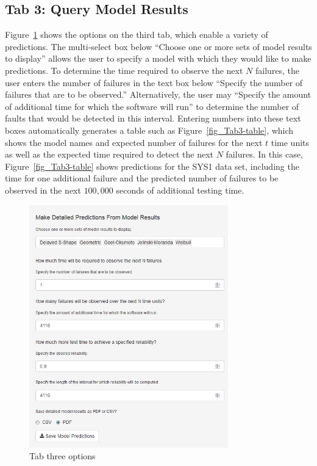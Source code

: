 \documentclass[journal]{IEEEtran}
\begin{document}
\subsection{Tab 3: Query Model Results}\label{tab3}
Figure~\ref{fig_Tab3} shows the options on the third tab, which enable a variety of predictions. The multi-select box below ``Choose one or more sets of model results to display'' allows the user to specify a model with which they would like to make predictions. To determine the time required to observe the next $N$ failures, the user enters the number of failures in the text box below ``Specify the number of failures that are to be observed.''  Alternatively, the user may ``Specify the amount of additional time for which the software will run'' to determine the number of faults that would be detected in this interval. Entering numbers into these text boxes automatically generates a table such as Figure~\ref{fig_Tab3-table}, which shows the model names and expected number of failures for the next $t$ time units as well as the expected time required to detect the next $N$ failures. In this case, Figure~\ref{fig_Tab3-table} shows predictions for the SYS1 data set, including the time for one additional failure and the predicted number of failures to be observed in the next $100,000$ seconds of additional testing time.

\begin{figure}[!h]
\centering%
\includegraphics[width=3.4in]{Figures/Fig13}
\caption{Tab three options}
\label{fig_Tab3}
\end{figure}
\end{document}
